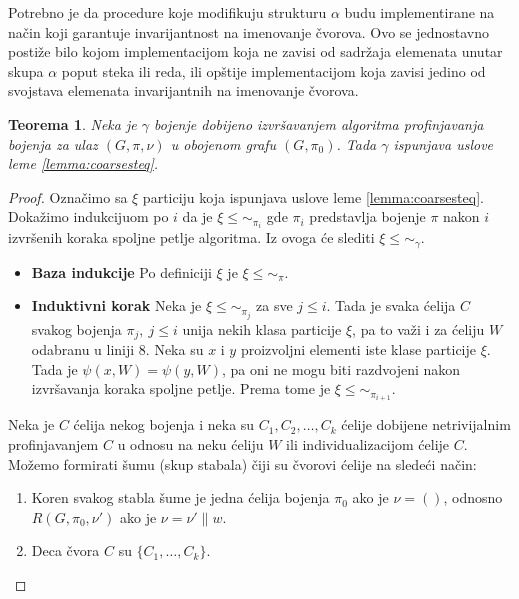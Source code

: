 \documentclass[12pt,oneside]{memoir}
\newtheorem{theorem}{Teorema}
\theoremstyle{definition}
\begin{document}
  Potrebno je da procedure koje modifikuju strukturu $\alpha$ budu
  implementirane na način koji garantuje invarijantnost na imenovanje čvorova.
  Ovo se jednostavno postiže bilo kojom implementacijom koja ne zavisi od
  sadržaja elemenata unutar skupa $\alpha$ poput steka ili reda, ili opštije
  implementacijom koja zavisi jedino od svojstava elemenata invarijantnih
  na imenovanje čvorova.

  \begin{theorem}
	  Neka je $\gamma$ bojenje dobijeno izvršavanjem algoritma profinjavanja
	  bojenja za ulaz $(G, \pi, \nu)$ u obojenom grafu $(G, \pi_0)$. Tada
	  $\gamma$ ispunjava uslove leme \ref{lemma:coarsesteq}.
  \end{theorem}

  \begin{proof}

	  Označimo sa $\xi$ particiju koja ispunjava uslove leme
	  \ref{lemma:coarsesteq}. Dokažimo indukcijuom po $i$ da je $\xi \leq
	  \sim_{\pi_i}$ gde $\pi_i$ predstavlja bojenje $\pi$ nakon $i$ izvršenih
	  koraka spoljne petlje algoritma. Iz ovoga će slediti $\xi \leq \sim_\gamma$.

	  \begin{itemize}
		  \item[] \textbf{Baza indukcije} Po definiciji $\xi$ je $\xi \leq \sim_{\pi}$.
		  \item[] \textbf{Induktivni korak} Neka je $\xi \leq \sim_{\pi_j}$ za sve $ j \leq i$.
			  Tada je svaka ćelija $C$ svakog bojenja $\pi_j,\ j \leq i$ unija nekih
			  klasa particije $\xi$, pa to važi i za ćeliju $W$ odabranu u
			  liniji 8.  Neka su $x$ i $y$ proizvoljni elementi iste klase
			  particije $\xi$. Tada je $\psi(x, W) = \psi(y, W)$, pa oni ne
			  mogu biti razdvojeni nakon izvršavanja koraka spoljne petlje.
			  Prema tome je $\xi \leq \sim_{\pi_{i+1}}$.
	  \end{itemize}

	  Neka je $C$ ćelija nekog bojenja i neka su $C_1, C_2, \dots, C_k$ ćelije
	  dobijene netrivijalnim profinjavanjem $C$ u odnosu na neku ćeliju $W$ ili
	  individualizacijom ćelije $C$. Možemo formirati šumu (skup stabala) čiji
	  su čvorovi ćelije na sledeći način:
	  \begin{enumerate}
		  \item Koren svakog stabla šume je jedna ćelija bojenja $\pi_0$ ako je
			  $\nu = ()$, odnosno $R(G, \pi_0, \nu')$ ako je $\nu = \nu' \| w$.
		  \item Deca čvora $C$ su $\{C_1, \dots, C_k\}$.
	  \end{enumerate}


\end{proof}
\end{document}
